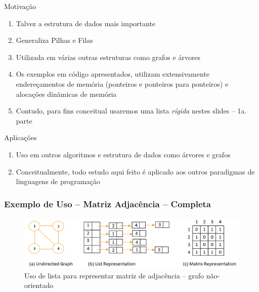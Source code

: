   \begin{frame}{Motivação}    
	\begin{enumerate}
	\item Talvez a estrutura de dados mais importante
	\item Generaliza Pilhas e Filas
	\item Utilizada em várias outras estruturas como grafos e árvores
	\pause
	\item Os exemplos em código apresentados, utilizam extensivamente 
	endereçamentos de memória (ponteiros e ponteiros para ponteiros) e alocações dinãmicas
	de memória
	\item Contudo, para fins conceitual usaremos uma lista {\em rígida} nestes slides -- 1a. parte
	\end{enumerate}
	
  \end{frame}
\begin{frame}{Aplicações}    
	\begin{enumerate}
	\item Uso em outros algoritmos e estrutura de dados como árvores e grafos
	\pause
	\item Conceitualmente, todo estudo aqui feito é aplicado
	aos outros paradigmas de linguagens de programação 
	\end{enumerate}
	
  \end{frame}

\begin{frame}
\frametitle{Exemplo de Uso -- Matriz Adjacência -- Completa}
\begin{figure}[!hb]
	\centering
		\includegraphics[height=0.40\paperheight, width=0.8\paperwidth]{figs/fig_listas/lista_matriz_adj01}			
			\caption{Uso de lista para representar matriz de adjacência -- grafo não-orientado}	
			\end{figure} 

  \end{frame}

